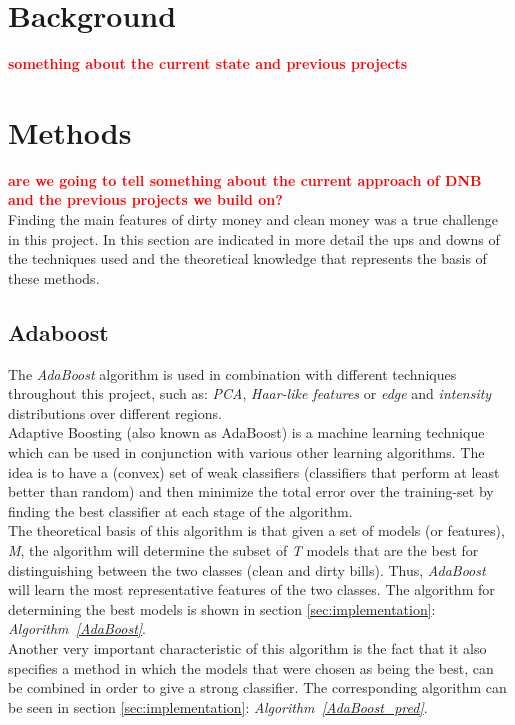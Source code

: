 \documentclass[11pt,twocolumn]{article}
\newcommand{\todo}[1]{\textcolor{red}{\textbf{#1}}}
\begin{document}
	\section{Background}\label{sec:background}
		\todo{something about the current state and previous projects}
	
	\section{Methods}\label{sec:Methods}
		\todo{are we going to tell something about the current approach of DNB and the
		previous projects we build on?}\\
		\hspace*{10px}Finding the main features of dirty money and clean money was a
		true challenge in this project. In this section are indicated in more detail
		the ups and downs of the techniques used and the theoretical knowledge that
		represents the basis of these methods.
	
	\subsection{Adaboost}\label{sec:Adaboost}
		\hspace*{10px}The \emph{AdaBoost} algorithm is used in combination with
		different techniques throughout this project, such as: \emph{PCA},
		\emph{Haar-like features} or \emph{edge} and \emph{intensity} distributions
		over different regions.\\ \hspace*{10px}Adaptive Boosting (also known as
		AdaBoost) is a machine learning technique which can be used in conjunction
		with various other learning algorithms. The idea is to have a (convex) set of
		weak classifiers (classifiers that perform at least better than random) and
		then minimize the total error over the training-set by finding the best
		classifier at each stage of the algorithm.\\ 
		\hspace*{10px}The theoretical basis of this algorithm is that given a set of
		models (or features), \emph{M}, the algorithm will determine the subset of
		\emph{T} models that are the best for distinguishing between the two classes
		(clean and dirty bills). Thus, \emph{AdaBoost} will learn the most
		representative features of the two classes. The algorithm for determining the
		best models is shown in section \ref{sec:implementation}:
		\emph{Algorithm~\ref{AdaBoost}}.\\ 
		\hspace*{10px}Another very important characteristic of this algorithm is the
		fact that it also specifies a method in which the models that were chosen as
		being the best, can be combined in order to give a strong classifier. The
		corresponding algorithm can be seen in section \ref{sec:implementation}:
		\emph{Algorithm~\ref{AdaBoost_pred}}.\\
		 
\end{document}
